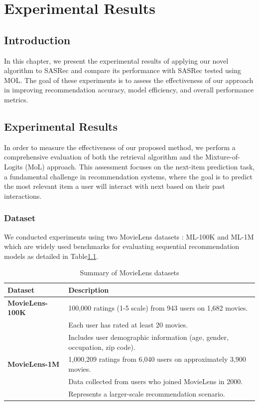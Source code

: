 \chapter{Experimental Results}
\pagestyle{fancy}
\pagestyle{fancy}\chead{} \pagestyle{fancy}\rhead{}
\pagestyle{fancy} 
\pagestyle{fancy}\cfoot{} \pagestyle{fancy}\rfoot{\thepage}
\section{Introduction}\label{start6}
In this chapter, we present the experimental results of applying our novel algorithm to SASRec and compare its performance with SASRec tested using MOL. The goal of these experiments is to assess the effectiveness of our approach in improving recommendation accuracy, model efficiency, and overall performance metrics.


\section{Experimental Results}\label{sec3}
In order to measure the effectiveness of our proposed method, we perform a comprehensive evaluation of both the retrieval algorithm and the Mixture-of-Logits (MoL) approach. This assessment focuses on the next-item prediction task, a fundamental challenge in recommendation systems\cite{kang2018selfat},
where the goal is to predict the most relevant item a user will interact with next based on their past interactions. 
\subsection{Dataset}
We conducted experiments using two MovieLens datasets : ML-100K and ML-1M \cite{Harper2015}which are widely used benchmarks for evaluating sequential recommendation models as detailed in Table\ref{tab_movielens}.\\
\begin{table}[h]
	\centering
	\renewcommand{\arraystretch}{1.2}
	\begin{tabular}{|l|p{10cm}|}
		\hline
		\textbf{Dataset} & \textbf{Description} \\
		\hline
		\textbf{MovieLens-100K} & 100,000 ratings (1-5 scale) from 943 users on 1,682 movies. \\
		& Each user has rated at least 20 movies. \\
		& Includes user demographic information (age, gender, occupation, zip code). \\
		\hline
		\textbf{MovieLens-1M} & 1,000,209 ratings from 6,040 users on approximately 3,900 movies. \\
		& Data collected from users who joined MovieLens in 2000. \\
		& Represents a larger-scale recommendation scenario. \\
		\hline
	\end{tabular}
	\caption{Summary of MovieLens datasets}
	\label{tab_movielens}
\end{table}

